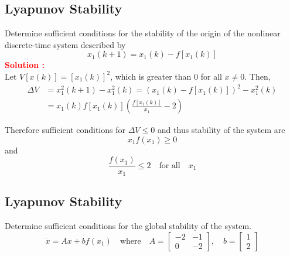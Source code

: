 \documentclass[12pt]{article}
\begin{document}
\subsection{Lyapunov Stability}

Determine sufficient conditions for the stability of the origin of the nonlinear discrete-time system described by
\[ x_1(k+1) = x_1(k) - f[x_1(k)] \]
\textbf{\textcolor{red}{Solution :}} \\
Let \(V[x(k)] = [x_1(k)]^2\), which is greater than \(0\) for all \(x \neq 0\). Then, 
\begin{align}
    \Delta V &= x_1^2(k+1) - x_1^2(k) = (x_1(k)-f[x_1(k)])^2 -x_1^2(k) \\
        & = x_1(k)f[x_1(k)]\left( \frac{f[x_1(k)]}{x_1}-2\right)
\end{align}

Therefore sufficient conditions for \(\Delta V \leq 0\) and thus stability of the system are
\[ x_1f(x_1) \geq 0 \]
and
\[ \frac{f(x_1)}{x_1} \leq 2 \quad \text{for all} \quad x_1\]
\clearpage

\subsection{Lyapunov Stability}

Determine sufficient conditions for the global stability of the system. 
\begin{equation}
    \dot{x} = Ax + bf(x_1) \quad \text{where} \quad A = \begin{bmatrix}
        -2 & -1 \\ 0 & -2
    \end{bmatrix}, \quad b = \begin{bmatrix}
        1 \\ 2
    \end{bmatrix}
\end{equation}
\end{document}
